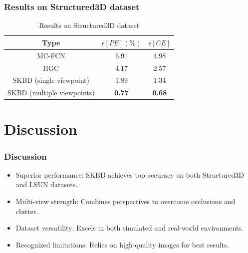 \documentclass{beamer}
\begin{document}
\begin{frame}
\frametitle{Results on Structured3D dataset}
\begin{table}[H]
\centering
\begin{tabular}{|c | c c |}
    \hline
    Type & $\epsilon[PE](\%)$ & $\epsilon[CE]$ \\ [0.5 ex]
    \hline\hline
    MC-FCN & 6.91 & 4.98 \\
    HGC & 4.17 & 2.57 \\
    SKBD (single viewpoint) & 1.89 & 1.34 \\
    \hline
    SKBD (multiple viewpoints) & \textbf{0.77} & \textbf{0.68} \\
    \hline
\end{tabular}
\caption{Results on Structured3D dataset}
\label{table:structured3dperf}
\end{table}
\end{frame}

\section{Discussion}
\begin{frame}
\frametitle{Discussion}
\begin{itemize}
    \item Superior performance: SKBD achieves top accuracy on both Structured3D and LSUN datasets.
    \item Multi-view strength: Combines perspectives to overcome occlusions and clutter.
    \item Dataset versatility: Excels in both simulated and real-world environments.
    \item Recognized limitations: Relies on high-quality images for best results.
\end{itemize}
\end{frame}
\end{document}
